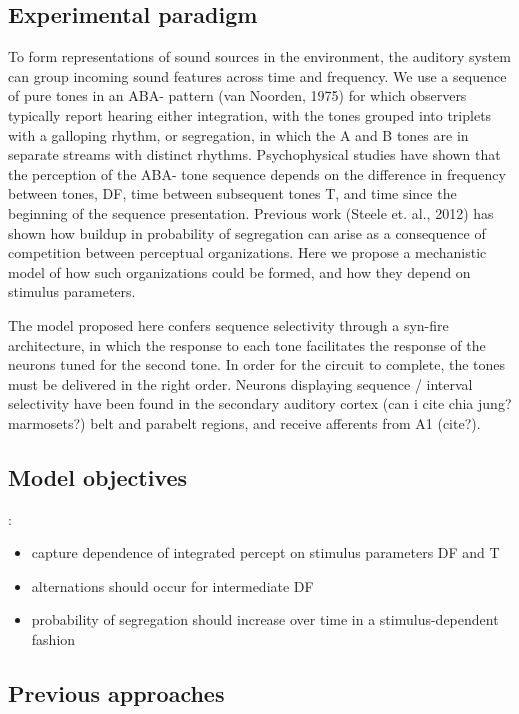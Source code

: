 \subsection{Experimental paradigm}
To form representations of sound sources in the environment, the auditory system can group incoming sound features across time and frequency. We use a sequence of pure tones in an ABA- pattern (van Noorden, 1975) for which observers typically report hearing either integration, with the tones grouped into triplets with a galloping rhythm, or segregation, in which the A and B tones are in separate streams with distinct rhythms. Psychophysical studies have shown that the perception of the ABA- tone sequence depends on the difference in frequency between tones, DF, time between subsequent tones T, and time since the beginning of the sequence presentation. Previous work (Steele et. al., 2012) has shown how buildup in probability of segregation can arise as a consequence of competition between
perceptual organizations. Here we propose a mechanistic model of how such organizations could be formed, and how they depend on stimulus parameters.

The model proposed here confers sequence selectivity through a syn-fire architecture, in which the response to each tone facilitates the response of the neurons tuned for the second tone. In order for the circuit to complete, the tones must be delivered in the right order. Neurons displaying sequence / interval selectivity have been found in the secondary auditory cortex (can i cite chia jung? marmosets?) belt and parabelt regions, and receive afferents from A1 (cite?). 

\subsection{Model objectives}:
\begin{itemize}
\item capture dependence of integrated percept on stimulus parameters DF and T
\item alternations should occur for intermediate DF
\item probability of segregation should increase over time in a stimulus-dependent fashion
\end{itemize}

\subsection{Previous approaches}

